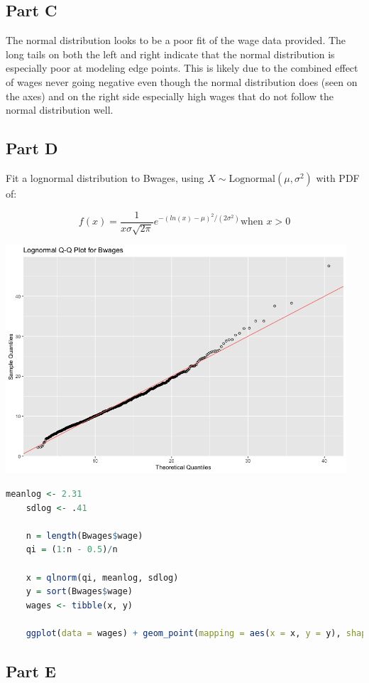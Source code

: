 \documentclass[letterpaper]{article}
\begin{document}
\subsection*{Part C}

The normal distribution looks to be a poor fit of the wage data provided. The long tails on both the left and right indicate that the normal distribution is especially poor at modeling edge points. This is likely due to the combined effect of wages never going negative even though the normal distribution does (seen on the axes) and on the right side especially high wages that do not follow the normal distribution well.

\subsection*{Part D}

Fit a lognormal distribution to Bwages, using $X \sim \text{Lognormal} (\mu, \sigma^2)$ with PDF of:

$$f(x) = \frac{1}{x \sigma \sqrt{2 \pi}} e^{-(ln(x) - \mu)^2 / (2 \sigma^2)} \text{when } x > 0$$

\begin{center}
    \includegraphics[width=5in]{LogQQPlot.png}
\end{center}

\begin{lstlisting}[language=R]
    meanlog <- 2.31
    sdlog <- .41

    n = length(Bwages$wage)
    qi = (1:n - 0.5)/n

    x = qlnorm(qi, meanlog, sdlog)
    y = sort(Bwages$wage)
    wages <- tibble(x, y)

    ggplot(data = wages) + geom_point(mapping = aes(x = x, y = y), shape = 1) + geom_abline(intercept = 0, slope = 1, color = "#F8766D") + xlab("Theoretical Quantiles") + ylab("Sample Quantiles") + ggtitle("Lognormal Q-Q Plot for Bwages")
\end{lstlisting}

\subsection*{Part E}
\end{document}
